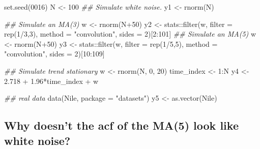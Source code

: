 \documentclass[
  letterpaper,
  DIV=11,
  numbers=noendperiod]{scrartcl}
\newenvironment{Shaded}{\begin{snugshade}}{\end{snugshade}}
\newcommand{\AttributeTok}[1]{\textcolor[rgb]{0.40,0.45,0.13}{#1}}
\newcommand{\DecValTok}[1]{\textcolor[rgb]{0.68,0.00,0.00}{#1}}
\newcommand{\DocumentationTok}[1]{\textcolor[rgb]{0.37,0.37,0.37}{\textit{#1}}}
\newcommand{\FloatTok}[1]{\textcolor[rgb]{0.68,0.00,0.00}{#1}}
\newcommand{\FunctionTok}[1]{\textcolor[rgb]{0.28,0.35,0.67}{#1}}
\newcommand{\NormalTok}[1]{\textcolor[rgb]{0.00,0.23,0.31}{#1}}
\newcommand{\OtherTok}[1]{\textcolor[rgb]{0.00,0.23,0.31}{#1}}
\newcommand{\SpecialCharTok}[1]{\textcolor[rgb]{0.37,0.37,0.37}{#1}}
\newcommand{\StringTok}[1]{\textcolor[rgb]{0.13,0.47,0.30}{#1}}
\begin{document}
\begin{Shaded}
\begin{Highlighting}[]
\FunctionTok{set.seed}\NormalTok{(}\DecValTok{0016}\NormalTok{)}
\NormalTok{N }\OtherTok{\textless{}{-}} \DecValTok{100}
\DocumentationTok{\#\# Simulate white noise.}
\NormalTok{y1 }\OtherTok{\textless{}{-}} \FunctionTok{rnorm}\NormalTok{(N)}

\DocumentationTok{\#\# Simulate an MA(3) }
\NormalTok{w }\OtherTok{\textless{}{-}} \FunctionTok{rnorm}\NormalTok{(N}\SpecialCharTok{+}\DecValTok{50}\NormalTok{)}
\NormalTok{y2 }\OtherTok{\textless{}{-}}\NormalTok{ stats}\SpecialCharTok{::}\FunctionTok{filter}\NormalTok{(w, }\AttributeTok{filter =} \FunctionTok{rep}\NormalTok{(}\DecValTok{1}\SpecialCharTok{/}\DecValTok{3}\NormalTok{,}\DecValTok{3}\NormalTok{), }
                    \AttributeTok{method =} \StringTok{"convolution"}\NormalTok{, }\AttributeTok{sides =} \DecValTok{2}\NormalTok{)[}\DecValTok{2}\SpecialCharTok{:}\DecValTok{101}\NormalTok{]}
\DocumentationTok{\#\# Simulate an MA(5)}
\NormalTok{w }\OtherTok{\textless{}{-}} \FunctionTok{rnorm}\NormalTok{(N}\SpecialCharTok{+}\DecValTok{50}\NormalTok{)}
\NormalTok{y3 }\OtherTok{\textless{}{-}}\NormalTok{ stats}\SpecialCharTok{::}\FunctionTok{filter}\NormalTok{(w, }\AttributeTok{filter =} \FunctionTok{rep}\NormalTok{(}\DecValTok{1}\SpecialCharTok{/}\DecValTok{5}\NormalTok{,}\DecValTok{5}\NormalTok{), }
                     \AttributeTok{method =} \StringTok{"convolution"}\NormalTok{, }\AttributeTok{sides =} \DecValTok{2}\NormalTok{)[}\DecValTok{10}\SpecialCharTok{:}\DecValTok{109}\NormalTok{]}

\DocumentationTok{\#\# Simulate trend stationary}
\NormalTok{w }\OtherTok{\textless{}{-}} \FunctionTok{rnorm}\NormalTok{(N, }\DecValTok{0}\NormalTok{, }\DecValTok{20}\NormalTok{)}
\NormalTok{time\_index }\OtherTok{\textless{}{-}} \DecValTok{1}\SpecialCharTok{:}\NormalTok{N}
\NormalTok{y4 }\OtherTok{\textless{}{-}} \FloatTok{2.718} \SpecialCharTok{+} \FloatTok{1.96}\SpecialCharTok{*}\NormalTok{time\_index }\SpecialCharTok{+}\NormalTok{ w}

\DocumentationTok{\#\# real data }
\FunctionTok{data}\NormalTok{(Nile, }\AttributeTok{package =} \StringTok{"datasets"}\NormalTok{)}
\NormalTok{y5 }\OtherTok{\textless{}{-}} \FunctionTok{as.vector}\NormalTok{(Nile)}
\end{Highlighting}
\end{Shaded}

\subsection{Why doesn't the acf of the MA(5) look like white
noise?}\label{why-doesnt-the-acf-of-the-ma5-look-like-white-noise}
\end{document}
